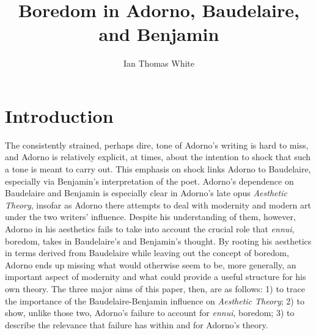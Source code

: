 \documentclass[12pt]{article}
\title{Boredom in Adorno, Baudelaire, and Benjamin}
\author{Ian Thomas White}
\date{}
\makeatletter
\renewcommand{\maketitle}
{
\begin{flushleft}
\textbf{{\large\@title}}
\newline
\@author
\end{flushleft}
}
\makeatother
\begin{document}
\thispagestyle{empty}

\begin{singlespacing}
\maketitle
\tableofcontents
\end{singlespacing}

\newpage

\section{Introduction}
The consistently strained, perhaps dire, tone of Adorno's writing is hard to miss, and Adorno is relatively explicit, at times, about the intention to shock that such a tone is meant to carry out. This emphasis on shock links Adorno to Baudelaire, especially via Benjamin's interpretation of the poet. Adorno's dependence on Baudelaire and Benjamin is especially clear in Adorno's late opus \textit{Aesthetic Theory}, insofar as Adorno there attempts to deal with modernity and modern art under the two writers' influence. Despite his understanding of them, however, Adorno in his aesthetics fails to take into account the crucial role that \textit{ennui}, boredom, takes in Baudelaire's and Benjamin's thought. By rooting his aesthetics in terms derived from Baudelaire while leaving out the concept of boredom, Adorno ends up missing what would otherwise seem to be, more generally, an important aspect of modernity and what could provide a useful structure for his own theory. The three major aims of this paper, then, are as follows: 1) to trace the importance of the Baudelaire-Benjamin influence on \textit{Aesthetic Theory}; 2) to show, unlike those two, Adorno's failure to account for \textit{ennui}, boredom; 3) to describe the relevance that failure has within and for Adorno's theory.
\end{document}
